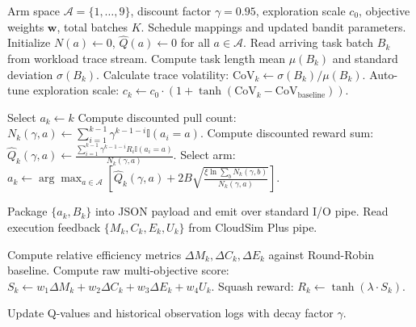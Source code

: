 \begin{algorithm}[H]
\caption{Dynamic Workload-Aware Discounted MAB Hyper-Heuristic}
\label{alg:mab_hyper_heuristic}
\begin{algorithmic}[1]
\REQUIRE Arm space $\mathcal{A} = \{1, \dots, 9\}$, discount factor $\gamma = 0.95$, exploration scale $c_0$, objective weights $\boldsymbol{w}$, total batches $K$.
\ENSURE Schedule mappings and updated bandit parameters.
\STATE Initialize $N(a) \leftarrow 0$, $\hat{Q}(a) \leftarrow 0$ for all $a \in \mathcal{A}$.
    \STATE Read arriving task batch $B_k$ from workload trace stream.
    \STATE Compute task length mean $\mu(B_k)$ and standard deviation $\sigma(B_k)$.
    \STATE Calculate trace volatility: $\text{CoV}_k \leftarrow \sigma(B_k) / \mu(B_k)$.
    \STATE Auto-tune exploration scale: $c_k \leftarrow c_0 \cdot (1 + \tanh(\text{CoV}_k - \text{CoV}_{\text{baseline}}))$.
    
        \STATE Select $a_k \leftarrow k$ 
    \ELSE
            \STATE Compute discounted pull count: $N_k(\gamma, a) \leftarrow \sum_{i=1}^{k-1} \gamma^{k-1-i} \mathbb{I}(a_i = a)$.
            \STATE Compute discounted reward sum: $\hat{Q}_k(\gamma, a) \leftarrow \frac{\sum_{i=1}^{k-1} \gamma^{k-1-i} R_i \mathbb{I}(a_i = a)}{N_k(\gamma, a)}$.
        \ENDFOR
        \STATE Select arm: $a_k \leftarrow \arg\max_{a \in \mathcal{A}} \left[ \hat{Q}_k(\gamma, a) + 2 B \sqrt{\frac{\xi \ln \sum_b N_k(\gamma, b)}{N_k(\gamma, a)}} \right]$.
    \ENDIF
    
    \STATE Package $\{a_k, B_k\}$ into JSON payload and emit over standard I/O pipe.
    \STATE Read execution feedback $\{M_k, C_k, E_k, U_k\}$ from CloudSim Plus pipe.
    
    \STATE Compute relative efficiency metrics $\Delta M_k, \Delta C_k, \Delta E_k$ against Round-Robin baseline.
    \STATE Compute raw multi-objective score: $S_k \leftarrow w_1 \Delta M_k + w_2 \Delta C_k + w_3 \Delta E_k + w_4 U_k$.
    \STATE Squash reward: $R_k \leftarrow \tanh(\lambda \cdot S_k)$.
    
    \STATE Update Q-values and historical observation logs with decay factor $\gamma$.
\ENDFOR
\end{algorithmic}
\end{algorithm}
